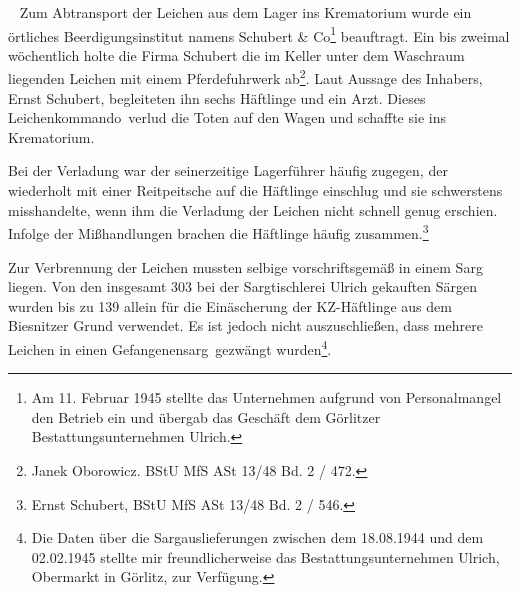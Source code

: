 \documentclass[a4paper,12pt,ngerman,
]{nisebook}
\begin{document}
~\newline
Zum Abtransport der Leichen aus dem Lager ins Krematorium wurde ein örtliches Beerdigungsinstitut namens Schubert \& Co\footnote{Am 11. Februar 1945 stellte das Unternehmen aufgrund von Personalmangel den Betrieb ein und übergab das Geschäft dem Görlitzer Bestattungsunternehmen Ulrich.} beauftragt. Ein bis zweimal wöchentlich holte die Firma Schubert die im Keller unter dem Waschraum liegenden Leichen mit einem Pferdefuhrwerk ab\footnote{Janek Oborowicz. BStU MfS ASt 13/48 Bd. 2 / 472.}. Laut Aussage des Inhabers, Ernst Schubert, begleiteten ihn sechs Häftlinge und ein Arzt. Dieses \glqq Leichenkommando\grqq~verlud die Toten auf den Wagen und schaffte sie ins Krematorium. 
\begin{leftbar} 
Bei der Verladung war der seinerzeitige Lagerführer häufig zugegen, der wiederholt mit einer Reitpeitsche auf die Häftlinge einschlug und sie schwerstens misshandelte, wenn ihm die Verladung der Leichen nicht schnell genug erschien. Infolge der Mißhandlungen brachen die Häftlinge häufig zusammen.\footnote{Ernst Schubert, BStU MfS ASt 13/48 Bd. 2 / 546.}
\end{leftbar}
Zur Verbrennung der Leichen mussten selbige vorschriftsgemäß in einem Sarg liegen. Von den insgesamt 303 bei der Sargtischlerei Ulrich gekauften Särgen wurden bis zu 139 allein für die Einäscherung der KZ-Häftlinge aus dem Biesnitzer Grund verwendet. Es ist jedoch nicht auszuschließen, dass mehrere Leichen in einen \glqq Gefangenensarg\grqq~gezwängt wurden\footnote{Die Daten über die Sargauslieferungen zwischen dem 18.08.1944 und dem 02.02.1945 stellte mir freundlicherweise das Bestattungsunternehmen Ulrich, Obermarkt in Görlitz, zur Verfügung.}.
\end{document}
